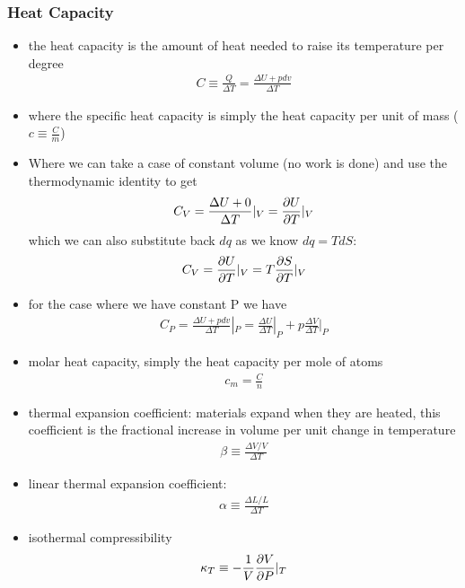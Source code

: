 \subsubsection{Heat Capacity}
\begin{itemize}
    \item the heat capacity is the amount of heat needed to raise its temperature per degree
    \begin{align}
        C \equiv \frac{Q}{\Delta T} = \frac{\Delta U + p dv}{\Delta T}
    \end{align}
    \item where the specific heat capacity is simply the heat capacity per unit of mass ($c \equiv \frac{C}{m}$)
    \item Where we can take a case of constant volume (no work is done) and use the thermodynamic
    identity to get
    \begin{align}
        C_V = \frac{\Delta U + 0}{\Delta T}|_V = \pdv{U}{T}|_V
    \end{align}
    which we can also substitute back $dq$ as we know $dq = T dS$:
    \begin{align}
        C_V = \pdv{U}{T}|_V = T \pdv{S}{T}|_V
    \end{align}
    \item for the case where we have constant P we have
    \begin{align}
        C_P = \frac{\Delta U + pdv}{\Delta T}|_P = \frac{\Delta U}{\Delta T}|_P + p \frac{\Delta V}{\Delta T}|_P
    \end{align}
	\item molar heat capacity, simply the heat capacity per mole of atoms
	\begin{align}
		c_m = \frac{C}{n}
	\end{align}
	\item thermal expansion coefficient: materials expand when they are heated, this coefficient is the fractional
	increase in volume per unit change in temperature
	\begin{align}
		\beta \equiv \frac{\Delta V/V}{\Delta T}
	\end{align}
	\item linear thermal expansion coefficient:
	\begin{align}
		\alpha \equiv \frac{\Delta L /L}{\Delta T}
	\end{align}
	\item isothermal compressibility
	\begin{align}
		\kappa_T \equiv -\frac{1}{V} \pdv{V}{P}|_T
	\end{align}
\end{itemize}


